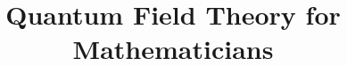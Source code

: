 \documentclass[a4paper, 12pt, oneside]{memoir}
\title{Quantum Field Theory for Mathematicians}
\author{}
\date{}
\begin{document}
\maketitle





\sloppy
\printbibliography
\end{document}
